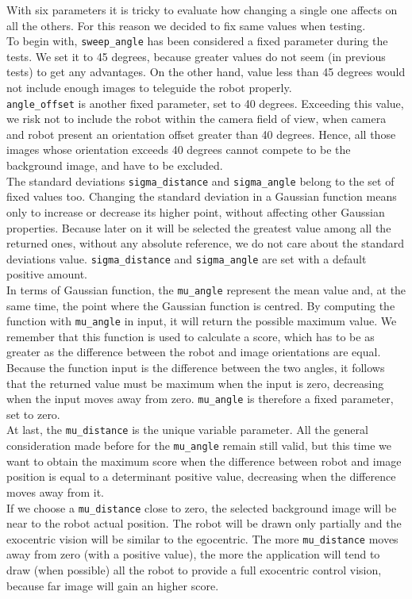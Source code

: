 With six parameters it is tricky to evaluate how changing
a single one affects on all the others. For this
reason we decided to fix same values when testing.
\\
To begin with, \texttt{sweep\_angle} has been considered a
fixed parameter during the tests. We set it to 45 degrees,
because greater values do not seem (in previous tests) to get
any advantages. On the other hand, value less than 45
degrees would not include enough images to teleguide the robot
properly.
\\
\texttt{angle\_offset} is another fixed parameter, set to 40
degrees. Exceeding this value, we risk not to include
the robot within the camera field of view, when camera and robot
present an orientation offset greater than 40 degrees.
Hence, all those images whose orientation exceeds 40 degrees
cannot compete to be the background image, 
and have to be excluded.
\\
The standard deviations \texttt{sigma\_distance} and
\texttt{sigma\_angle} belong to the set of
fixed values too. Changing the standard deviation in a Gaussian
function means only to increase or decrease its higher
point, without affecting other Gaussian properties. Because later
on it will be selected the greatest value among
all the returned ones, without any absolute reference, we do not
care about the standard deviations value.
\texttt{sigma\_distance} and \texttt{sigma\_angle} are set
with a default positive amount.
\\
In terms of Gaussian function, the \texttt{mu\_angle} represent
the mean value and, at the same time, the point where
the Gaussian function is centred. By computing the function with
\texttt{mu\_angle} in input, it will return the possible
maximum value. We remember that this function is used to calculate
a score, which has to be as greater as the difference
between the robot and image orientations are equal. Because the
function input is the difference between the two angles, it
follows that the returned value must be maximum when the input is
zero, decreasing when the input moves away from zero.
\texttt{mu\_angle} is therefore a fixed parameter, set to zero.
\\
At last, the \texttt{mu\_distance} is the unique variable parameter.
All the general consideration made before for the 
\texttt{mu\_angle} remain still valid, but this time we want to
obtain the maximum score when the difference between
robot and image position is equal to a determinant positive value,
decreasing when the difference moves away from it.
\\
If we choose a \texttt{mu\_distance} close to zero, the selected
background image will be near to the robot actual position.
The robot will be drawn only partially and the exocentric vision
will be similar to the egocentric. The more
\texttt{mu\_distance} moves away from zero (with a positive value),
the more the application will tend to draw
(when possible) all the robot to provide a full exocentric control
vision, because far image will gain an higher score.

